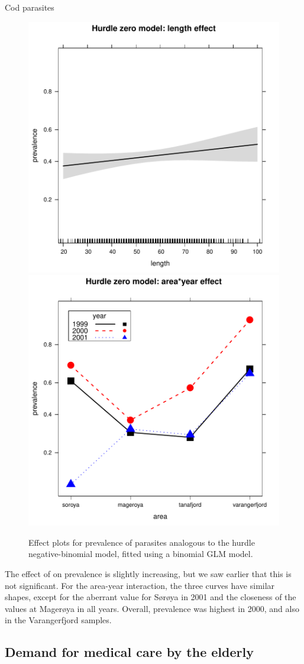 \documentclass[11pt]{book}\usepackage[]{graphicx}\usepackage[]{color}
\newenvironment{knitrout}{}{} %
\renewenvironment{knitrout}{\small\renewcommand{\baselinestretch}{.85}}{} %
\begin{document}
\begin{Example}[cod3]{Cod parasites}
\begin{knitrout}
\begin{figure}[!htbp]
\centerline{\includegraphics[width=.49\textwidth]{ch09/fig/cod3-eff2-1} 
\includegraphics[width=.49\textwidth]{ch09/fig/cod3-eff2-2} }

\caption[Effect plots for prevalence of parasites analogous to  the hurdle negative-binomial model, fitted using a binomial GLM model]{Effect plots for prevalence of parasites analogous to  the hurdle negative-binomial model, fitted using a binomial GLM model.\label{fig:cod3-eff2}}
\end{figure}


\end{knitrout}
The effect of  on prevalence is slightly increasing, but we saw earlier that this is
not significant.  For the area-year interaction, the three curves have similar shapes, except
for the aberrant value for S{\o}r{\o}ya in 2001 and the closeness of the values at
Mager{\o}ya in all years. Overall, prevalence was highest in 2000, and also in
the Varangerfjord samples.

\end{Example}


\subsection{Demand for medical care by the elderly}\label{sec:glm-case-nmes}
\end{document}
